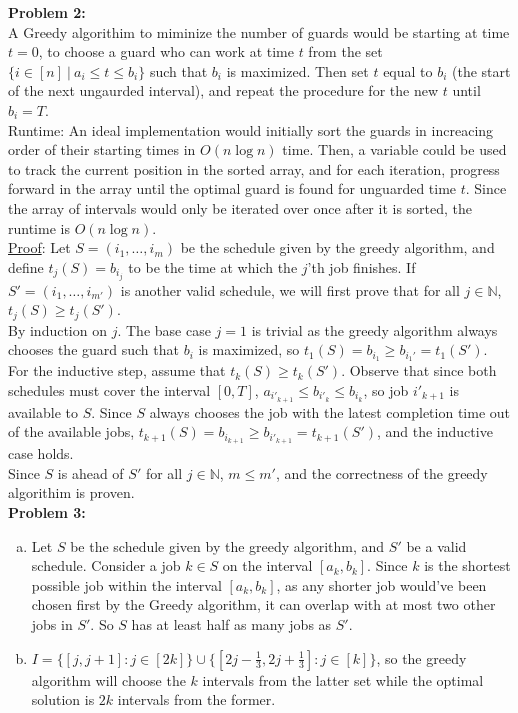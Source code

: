 \documentclass{article}
\begin{document}
\textbf{Problem 2:}  \\[1.0ex]
A Greedy algorithim to miminize the number of guards would be starting at time $t = 0$, to choose a guard who can work at time $t$ from the set $\{i \in [n]\ |\ a_i \leq t \leq b_i\}$ such that $b_i$ is maximized. Then set $t$ equal to $b_i$ (the start of the next ungaurded interval), and repeat the procedure for the new $t$ until $b_i = T$. \\[0.5ex]
Runtime: An ideal implementation would initially sort the guards in increacing order of their starting times in $O (n \log n)$ time. Then, a variable could be used to track the current position in the sorted array, and for each iteration, progress forward in the array until the optimal guard is found for unguarded time $t$. Since the array of intervals would only be iterated over once after it is sorted, the runtime is $O (n \log n)$. \\[1.0ex]
\underline{Proof}: Let $S = (i_1, \dots ,i_m)$ be the schedule given by the greedy algorithm, and define $t_j(S) = b_{i_j}$ to be the time at which the $j$'th job finishes. 
If $S' = (i_1,\dots,i_{m'})$ is another valid schedule, we will first prove that for all $j \in \mathbb{N}$, $t_j(S) \geq t_j(S') $.\\[0.75ex]
By induction on $j$. The base case $j = 1$ is trivial as the greedy algorithm always chooses the guard such that $b_i$ is maximized, so $t_1(S) = b_{i_1} \geq b_{i_1'} = t_1(S')$. For the inductive step, assume that $t_k(S) \geq t_k(S')$. 
Observe that since both schedules must cover the interval $[0, T]$, $a_{i'_{k + 1}} \leq b_{i'_k} \leq b_{i_k}$, so job $i'_{k + 1}$ is available to $S$. Since $S$ always chooses 
the job with the latest completion time out of the available jobs, $t_{k + 1}(S) = b_{i_{k + 1}} \geq b_{i'_{k + 1}} = t_{k + 1}(S')$, and the inductive case holds. \\[1.0ex]
Since $S$ is ahead of $S'$ for all $j \in \mathbb{N}$, $m \leq m'$, and the correctness of the greedy algorithim is proven.\\[1.0ex]
\textbf{Problem 3:}
\begin{enumerate}[a)]
    \item Let $S$ be the schedule given by the greedy algorithm, and $S'$ be a valid schedule. Consider a job $k \in S$ on the interval $[a_k, b_k]$. Since $k$ is the shortest possible job within the interval $[a_k, b_k]$, as any shorter job would've been chosen first by the Greedy algorithm, it can overlap with at most two other jobs in $S'$. So $S$ has at least half as many jobs as $S'$.
    \item $I = \{[j, j + 1] : j \in [2k] \} \cup \{[2j - \frac{1}{3}, 2j + \frac{1}{3}] : j \in [k]\}$, so the greedy algorithm will choose the $k$ intervals from the latter set while the optimal solution is $2k$ intervals from the former.
\end{enumerate} 
\end{document}
